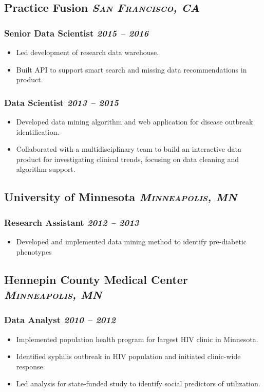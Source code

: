 \documentclass[11pt]{article}
\newcommand{\rside}[1]{
  \hfill {\itshape #1}%
}
\begin{document}
\subsection{Practice Fusion \rside{\normalfont\large\bfseries\scshape{San Francisco, CA}}}
\subsubsection{Senior Data Scientist\rside{2015 -- 2016}}
\begin{itemize}[label=-]
    \item Led development of research data warehouse.
    \item Built API to support smart search and missing data recommendations in product.
\end{itemize}
\subsubsection{Data Scientist\rside{2013 -- 2015}}
\begin{itemize}[label=-]
    \item Developed data mining algorithm and web application for disease outbreak identification.
    \item Collaborated with a multidisciplinary team to build an interactive data product for investigating clinical trends, focusing on data cleaning and algorithm support.
\end{itemize}

\subsection{University of Minnesota \rside{\normalfont\large\bfseries\scshape{Minneapolis, MN}}}
\subsubsection{Research Assistant\rside{2012 -- 2013}}
\begin{itemize}[label=-]
    \item Developed and implemented data mining method to identify pre-diabetic phenotypes
\end{itemize}

\subsection{Hennepin County Medical Center \rside{\normalfont\large\bfseries\scshape{Minneapolis, MN}}}
\subsubsection{Data Analyst\rside{2010 -- 2012}}
\begin{itemize}[label=-]
    \item Implemented population health program for largest HIV clinic in Minnesota.
    \item Identified syphilis outbreak in HIV population and initiated clinic-wide response.
    \item Led analysis for state-funded study to identify social predictors of utilization.
\end{itemize}
\end{document}
